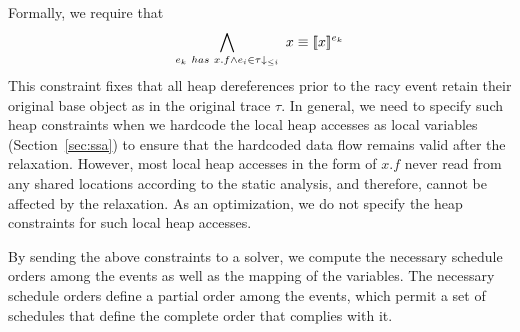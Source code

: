 Formally, we require that
$$
\bigwedge_{ e_k \ has\  x.f \wedge e_i \in \tau\downarrow_{\leq i} }\
	x \equiv  \lbrack\!\lbrack x \rbrack\!\rbrack^{e_k}
$$
This constraint fixes that all heap dereferences  prior to the racy event retain their original base object as in the original trace $\tau$. 
In general, we need to specify such heap constraints when we hardcode the local heap accesses as local variables (Section~\ref{sec:ssa}) to ensure that the hardcoded data flow remains valid  after the relaxation. However,  most local heap accesses in the form of $x.f$ never read from any shared locations according to the static analysis, and therefore, cannot be affected by the relaxation. As an optimization, we do not specify the heap constraints for such local heap accesses.



By sending the above constraints to a solver, we compute the necessary schedule orders among the events as well as the mapping of the variables. The necessary schedule orders define a partial order among the events, which permit a set of schedules that define the complete order that complies with it.


